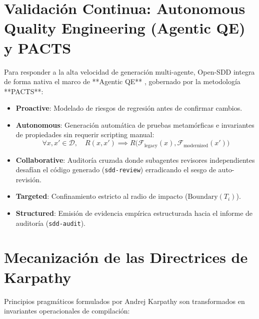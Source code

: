 \documentclass[11pt,a4paper]{article}
\begin{document}
\section{Validación Continua: Autonomous Quality Engineering (Agentic QE) y PACTS}

Para responder a la alta velocidad de generación multi-agente, Open-SDD integra de forma nativa el marco de **Agentic QE** \cite{spiridonov2026agentic}, gobernado por la metodología **PACTS**:
\begin{itemize}
    \item \textbf{Proactive}: Modelado de riesgos de regresión antes de confirmar cambios.
    \item \textbf{Autonomous}: Generación automática de pruebas metamórficas e invariantes de propiedades sin requerir scripting manual:
    \begin{equation}
        \forall x, x' \in \mathcal{D}, \quad R(x, x') \implies R\bigl(\mathcal{F}_{\text{legacy}}(x), \mathcal{F}_{\text{modernized}}(x')\bigr)
    \end{equation}
    \item \textbf{Collaborative}: Auditoría cruzada donde subagentes revisores independientes desafían el código generado (\texttt{sdd-review}) erradicando el sesgo de auto-revisión.
    \item \textbf{Targeted}: Confinamiento estricto al radio de impacto ($\text{Boundary}(T_i)$).
    \item \textbf{Structured}: Emisión de evidencia empírica estructurada hacia el informe de auditoría (\texttt{sdd-audit}).
\end{itemize}

\section{Mecanización de las Directrices de Karpathy}

Principios pragmáticos formulados por Andrej Karpathy \cite{karpathy2025} son transformados en invariantes operacionales de compilación:
\end{document}
